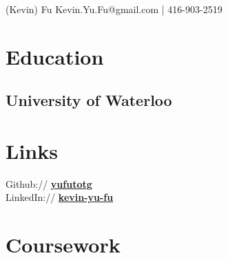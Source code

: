 \documentclass[letterpaper]{kevin-resume} %
\begin{document}


 {(Kevin) Fu} { %
	Kevin.Yu.Fu@gmail.com | 416-903-2519 %
}


\begin{minipage}[t]{0.30\textwidth} %


\section{Education} 

\subsection{University of Waterloo}




\section{Links} 

Github:// \href{https://github.com/YuFuTotG} {\textbf{yufutotg}} \\
LinkedIn:// \href{https://ca.linkedin.com/in/kevin-yu-fu} {\textbf{kevin-yu-fu}} \\

\sectionspace %


\section{Coursework}


\end{minipage}
\end{document}

